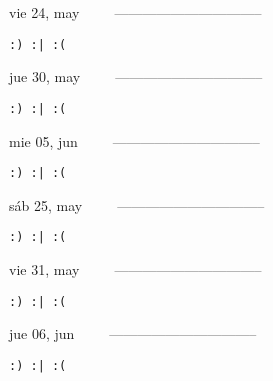 \documentclass[letterpaper,10pt]{article}
\begin{document}
\begin{multicols}{3}
{vie 24, may\ \ \ \ \ --------------------------------}
\begin{flushright}\begin{small}\texttt{:) :| :(}\end{small}\end{flushright}
\vfill
{jue 30, may\ \ \ \ \ --------------------------------}
\begin{flushright}\begin{small}\texttt{:) :| :(}\end{small}\end{flushright}\par
\vfill
{mie 05, jun\ \ \ \ \ --------------------------------}
\begin{flushright}\begin{small}\texttt{:) :| :(}\end{small}\end{flushright}\par
\vfill
\end{multicols}
\vspace{1.05cm}

\begin{multicols}{3}
{sáb 25, may\ \ \ \ \ --------------------------------}
\begin{flushright}\begin{small}\texttt{:) :| :(}\end{small}\end{flushright}
\vfill
{vie 31, may\ \ \ \ \ --------------------------------}
\begin{flushright}\begin{small}\texttt{:) :| :(}\end{small}\end{flushright}\par
\vfill
{jue 06, jun\ \ \ \ \ --------------------------------}
\begin{flushright}\begin{small}\texttt{:) :| :(}\end{small}\end{flushright}\par
\vfill
\end{multicols}
\vspace{1.05cm}
\end{document}
